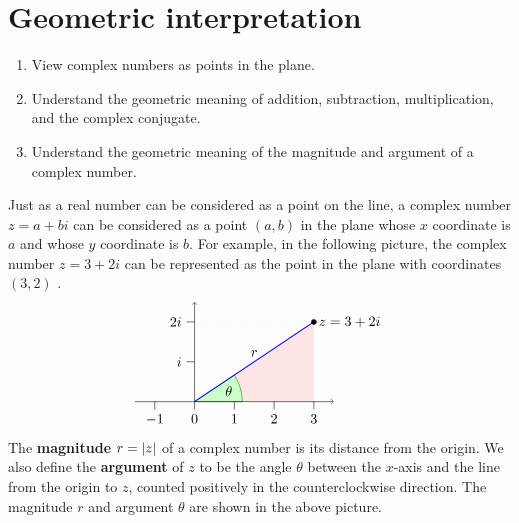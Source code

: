 \section{Geometric interpretation}

\begin{outcome}
  \begin{enumerate}
  \item View complex numbers as points in the plane.
  \item Understand the geometric meaning of addition, subtraction,
    multiplication, and the complex conjugate.
  \item Understand the geometric meaning of the magnitude and argument
    of a complex number.
  \end{enumerate}
\end{outcome}

Just as a real number can be considered as a point on the line, a
complex number $z = a + bi$ can be considered as a point $(a,b)$ in
the plane whose $x$ coordinate is $a$ and whose $y$ coordinate is
$b$. For example, in the following picture, the complex number
$z = 3+2i$ can be represented as the point in the plane with
coordinates $(3,2)$%
.
\begin{equation*}
  \begin{tikzpicture}
    \draw[help lines, dotted, fill=red!10] (0,0) -- (3,0) -- (3,2) -- cycle;
    \draw[help lines, dotted] (0,2) -- (3,2);
    \filldraw[fill=green!20,draw=green!50!black] (0,0) -- (1.2,0) arc (0:33.69:1.2) -- cycle;
    \node at (16.845:9mm){$\theta$};
    \draw[->](-1.5,0) -- (3.5,0);
    \draw[->](0,0) -- (0,2.5);
    \draw(0,1) -- +(-0.2,0) node[left] {$i$};
    \draw(0,2) -- +(-0.2,0) node[left] {$2i$};
    \draw(-1,0) -- +(0,-0.2) node[below] {$-1$};
    \draw(0,0) -- +(0,-0.2) node[below] {$0$};
    \draw(1,0) -- +(0,-0.2) node[below] {$1$};
    \draw(2,0) -- +(0,-0.2) node[below] {$2$};
    \draw(3,0) -- +(0,-0.2) node[below] {$3$};
    \draw[thick, blue] (0,0) -- node[above, black] {$r$} (3,2);
    \draw[fill, black] (3,2) circle [radius=1.8pt] node [right] {$z = 3+2i$};
  \end{tikzpicture}
\end{equation*}
The \textbf{magnitude}%
%
 $r=\left|z\right|$ of a complex number
is its distance from the origin. We also define the \textbf{argument}
of $z$ to be the angle $\theta$ between the $x$-axis and the line from
the origin to $z$, counted positively in the counterclockwise
direction. The magnitude $r$ and argument $\theta$ are shown in the
above picture.

